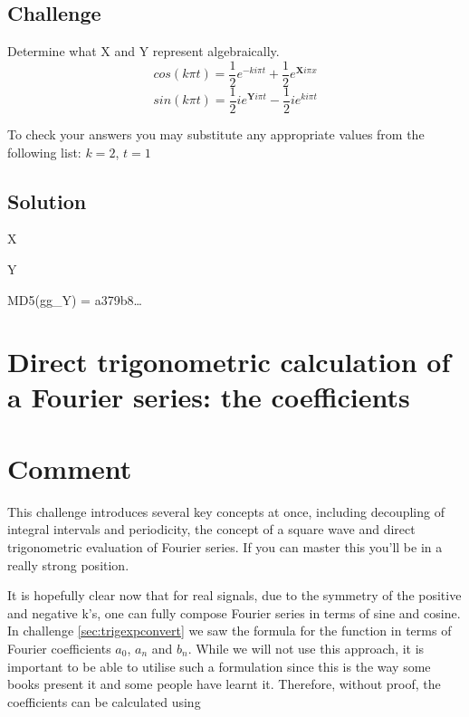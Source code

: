\subsection*{Challenge}
Determine what X and Y represent algebraically.
\begin{equation}
    cos(k \pi t) = \frac{1}{2} e^{-k i\pi t} + \frac{1}{2} e^{\bm{X} i \pi x}
\end{equation}
\begin{equation}
    sin(k \pi t) = \frac{1}{2} i e^{\bm{Y} i \pi t} - \frac{1}{2} i e^{k i \pi t}
\end{equation}

To check your answers you may substitute any appropriate values from the following list: $k=2$, $t=1$

\subsection*{Solution}
X


Y

MD5(gg\_Y) = a379b8\ldots




\newpage
\section{Direct trigonometric calculation of a Fourier series: the coefficients}
\label{sec:fs_squarewave}

\section*{Comment}
This challenge introduces several key concepts at once, including decoupling of integral intervals and periodicity, the concept of a square wave and direct trigonometric evaluation of Fourier series. If you can master this you'll be in a really strong position.

It is hopefully clear now that for real signals, due to the symmetry of the positive and negative k's, one can fully compose Fourier series in terms of sine and cosine. In challenge \ref{sec:trigexpconvert} we saw the formula for the function in terms of Fourier coefficients $a_0$, $a_n$ and $b_n$. While we will not use this approach, it is important to be able to utilise such a formulation since this is the way some books present it and some people have learnt it. Therefore, without proof, the coefficients can be calculated using

